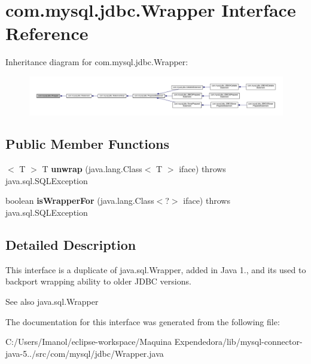 \hypertarget{interfacecom_1_1mysql_1_1jdbc_1_1_wrapper}{}\section{com.\+mysql.\+jdbc.\+Wrapper Interface Reference}
\label{interfacecom_1_1mysql_1_1jdbc_1_1_wrapper}


Inheritance diagram for com.\+mysql.\+jdbc.\+Wrapper\+:
\nopagebreak
\begin{figure}[H]
\begin{center}
\leavevmode
\includegraphics[width=350pt]{interfacecom_1_1mysql_1_1jdbc_1_1_wrapper__inherit__graph}
\end{center}
\end{figure}
\subsection*{Public Member Functions}
\begin{DoxyCompactItemize}
\item 
\mbox{\label{interfacecom_1_1mysql_1_1jdbc_1_1_wrapper_afc63dc50b1a41fb77630e7f24e0cb6ef}} 
$<$ T $>$ T {\bfseries unwrap} (java.\+lang.\+Class$<$ T $>$ iface)  throws java.\+sql.\+S\+Q\+L\+Exception
\item 
\mbox{\label{interfacecom_1_1mysql_1_1jdbc_1_1_wrapper_a5715bc60795c93906e8548d749a5242d}} 
boolean {\bfseries is\+Wrapper\+For} (java.\+lang.\+Class$<$?$>$ iface)  throws java.\+sql.\+S\+Q\+L\+Exception
\end{DoxyCompactItemize}


\subsection{Detailed Description}
This interface is a duplicate of java.\+sql.\+Wrapper, added in Java 1., and it\textquotesingle{}s used to backport wrapping ability to older J\+D\+BC versions.

\begin{DoxySeeAlso}{See also}
java.\+sql.\+Wrapper 
\end{DoxySeeAlso}


The documentation for this interface was generated from the following file\+:\begin{DoxyCompactItemize}
\item 
C\+:/\+Users/\+Imanol/eclipse-\/workspace/\+Maquina Expendedora/lib/mysql-\/connector-\/java-\/5../src/com/mysql/jdbc/Wrapper.\+java\end{DoxyCompactItemize}
